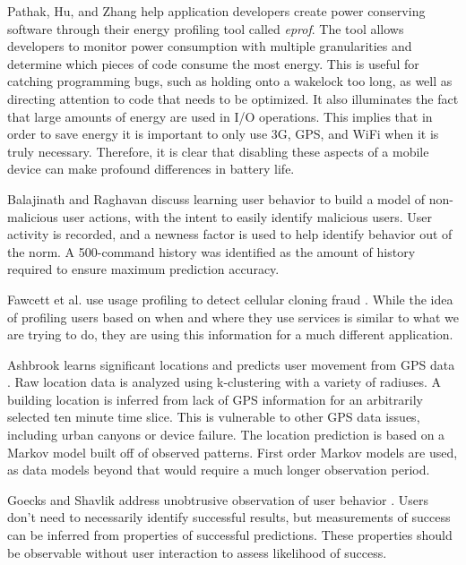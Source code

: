 \documentclass[11pt,twocolumn]{article}
\begin{document}
Pathak, Hu, and Zhang help application developers create power conserving software through their energy profiling tool called \emph{eprof}\cite{Pathak:2012:ESI:2168836.2168841}. 
The tool allows developers to monitor power consumption with multiple granularities and determine which pieces of code consume the most energy. 
This is useful for catching programming bugs, such as holding onto a wakelock too long, as well as directing attention to code that needs to be optimized. 
It also illuminates the fact that large amounts of energy are used in I/O operations. 
This implies that in order to save energy it is important to only use 3G, GPS, and WiFi when it is truly necessary. 
Therefore, it is clear that disabling these aspects of a mobile device can make profound differences in battery life.

Balajinath and Raghavan discuss learning user behavior to build a model of non-malicious user actions, with the intent to easily identify malicious users\cite{Balajinath:2001:IDT:2294491.2294970}. 
User activity is recorded, and a newness factor is used to help identify behavior out of the norm. 
A 500-command history was identified as the amount of history required to ensure maximum prediction accuracy. 

Fawcett et al. use usage profiling to detect cellular cloning fraud \cite{dataMiningFraudDetection}. 
While the idea of profiling users based on when and where they use services is similar to what we are trying to do, they are using this information for a much different application. 

Ashbrook learns significant locations and predicts user movement from GPS data \cite{Ashbrook:2002:LSL:862896.881068}. 
Raw location data is analyzed using k-clustering with a variety of radiuses. 
A building location is inferred from lack of GPS information for an arbitrarily selected ten minute time slice. 
This is vulnerable to other GPS data issues, including urban canyons or device failure. 
The location prediction is based on a Markov model built off of observed patterns. 
First order Markov models are used, as data models beyond that would require a much longer observation period. 

Goecks and Shavlik address unobtrusive observation of user behavior \cite{Goecks:2000:LUI:325737.325806}. 
Users don't need to necessarily identify successful results, but measurements of success can be inferred from properties of successful predictions. 
These properties should be observable without user interaction to assess likelihood of success. 
\end{document}
